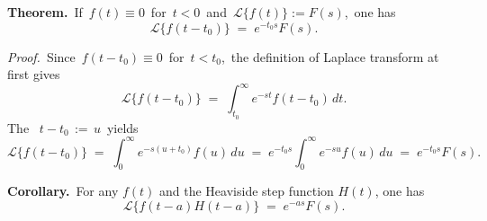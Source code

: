 \documentclass[12pt]{article}
\theoremstyle{definition}
\begin{document}
\textbf{Theorem.}\, If\, $f(t) \equiv 0$\, for\, $t < 0$\, and\,  $\mathcal{L}\{f(t)\} := F(s)$,\, one has
$$\mathcal{L}\{f(t\!-\!t_0)\}\;=\; e^{-t_0s}F(s).$$


{\em Proof.}\, Since\, $f(t\!-\!t_0) \equiv 0$\, for\, $t < t_0$,\, the definition of Laplace transform at first gives
$$\mathcal{L}\{f(t\!-\!t_0)\}\;=\; \int_{t_0}^\infty e^{-st}f(t\!-\!t_0)\,dt.$$
The \, $t\!-\!t_0 \,:=\, u$\, yields
$$\mathcal{L}\{f(t\!-\!t_0)\} \;=\; \int_{0}^\infty e^{-s(u+t_0)}f(u)\,du
\;=\; e^{-t_0s}\int_{0}^\infty e^{-su}f(u)\,du \;=\; e^{-t_0s}F(s).$$


\textbf{Corollary.}\, For any $f(t)$ and the Heaviside step function $H(t)$, one has
$$\mathcal{L}\{f(t\!-\!a)H(t\!-\!a)\} \;=\; e^{-as}F(s).$$

\end{document}
